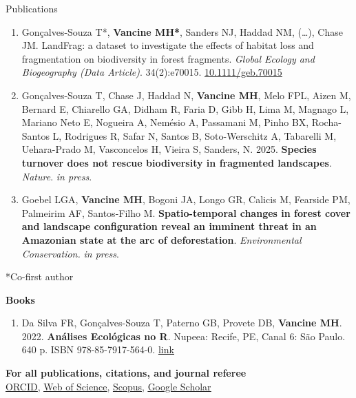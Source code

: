 \documentclass{resume}
\begin{document}
\begin{rSection}{Publications}
\begin{enumerate}
\item Gonçalves-Souza T*, {\bf Vancine MH*}, Sanders NJ, Haddad NM, (…), Chase JM. LandFrag: a dataset to investigate the effects of habitat loss and fragmentation on biodiversity in forest fragments. {\it Global Ecology and Biogeography (Data Article)}. 34(2):e70015. \href{https://doi.org/10.1111/geb.70015}{\underline{10.1111/geb.70015}}

\item Gonçalves-Souza T, Chase J, Haddad N, {\bf Vancine MH}, Melo FPL, Aizen M, Bernard E, Chiarello GA, Didham R, Faria D, Gibb H, Lima M, Magnago L, Mariano Neto E, Nogueira A, Nemésio A, Passamani M, Pinho BX, Rocha-Santos L, Rodrigues R, Safar N, Santos B, Soto-Werschitz A, Tabarelli M, Uehara-Prado M, Vasconcelos H, Vieira S, Sanders, N. 2025. {\bf Species turnover does not rescue biodiversity in fragmented landscapes}. {\it Nature}. {\it in press}.

\item Goebel LGA, {\bf Vancine MH}, Bogoni JA, Longo GR, Calicis M, Fearside PM, Palmeirim AF, Santos-Filho M. {\bf Spatio-temporal changes in forest cover and landscape configuration reveal an imminent threat in an Amazonian state at the arc of deforestation}. {\it Environmental Conservation.} {\it in press}.

\end{enumerate} 

*Co-first author

{\bf Books}

\begin{enumerate} 
\item Da Silva FR, Gonçalves-Souza T, Paterno GB, Provete DB, {\bf Vancine MH}. 2022. {\bf Análises Ecológicas no R}. Nupeea: Recife, PE, Canal 6: São Paulo. 640 p. ISBN 978-85-7917-564-0. \href{https://analises-ecologicas.com/}{\underline{link}}
\end{enumerate} 

{\bf For all publications, citations, and journal referee}
\\\href{https://orcid.org/0000-0001-9650-7575}{\underline{ORCID}}, \href{https://www.webofscience.com/wos/author/record/837504}{\underline{Web of Science}}, \href{https://www.scopus.com/authid/detail.uri?authorId=57193451888}{\underline{Scopus}}, \href{https://scholar.google.com/citations?user=i-2xZBQAAAAJ}{\underline{Google Scholar}}

\end{rSection}

\end{document}
